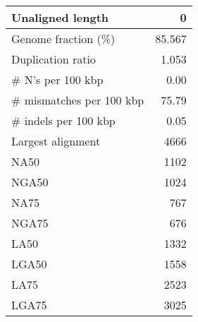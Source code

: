 \documentclass[12pt,a4paper]{article}
\begin{document}
\begin{table}[ht]
\begin{center}
\begin{tabular}{|l*{1}{|r}|}
Unaligned length & 0 \\ \hline
Genome fraction (\%) & 85.567 \\ \hline
Duplication ratio & 1.053 \\ \hline
\# N's per 100 kbp & 0.00 \\ \hline
\# mismatches per 100 kbp & 75.79 \\ \hline
\# indels per 100 kbp & 0.05 \\ \hline
Largest alignment & 4666 \\ \hline
NA50 & 1102 \\ \hline
NGA50 & 1024 \\ \hline
NA75 & 767 \\ \hline
NGA75 & 676 \\ \hline
LA50 & 1332 \\ \hline
LGA50 & 1558 \\ \hline
LA75 & 2523 \\ \hline
LGA75 & 3025 \\ \hline
\end{tabular}
\end{center}
\end{table}
\end{document}

